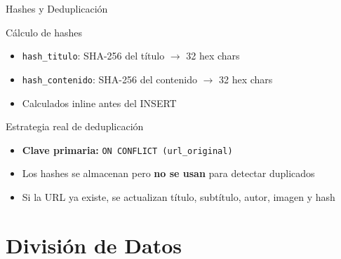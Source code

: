 \documentclass[11pt,aspectratio=169,spanish]{beamer}
\begin{document}
\begin{frame}[fragile]{Hashes y Deduplicación}
    \begin{block}{Cálculo de hashes}
        \begin{itemize}
            \item \texttt{hash\_titulo}: SHA-256 del título $\to$ 32 hex chars
            \item \texttt{hash\_contenido}: SHA-256 del contenido $\to$ 32 hex chars
            \item Calculados inline antes del INSERT
        \end{itemize}
    \end{block}

    \vspace{0.3cm}
    \begin{alertblock}{Estrategia real de deduplicación}
        \begin{itemize}
            \item \textbf{Clave primaria:} \texttt{ON CONFLICT (url\_original)}
            \item Los hashes se almacenan pero \textbf{no se usan} para detectar duplicados
            \item Si la URL ya existe, se actualizan título, subtítulo, autor, imagen y hash
        \end{itemize}
    \end{alertblock}
\end{frame}

\section{División de Datos}
\end{document}
